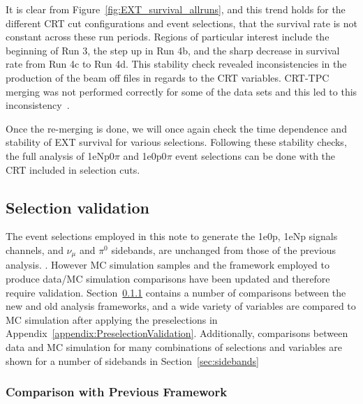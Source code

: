 It is clear from Figure~\ref{fig:EXT_survival_allruns}, and this trend holds for the different CRT cut configurations and event selections, that the survival rate is not constant across these run periods. Regions of particular interest include the beginning of Run 3, the step up in Run 4b, and the sharp decrease in survival rate from Run 4c to Run 4d. This stability check revealed inconsistencies in the production of the beam off files in regards to the CRT variables. CRT-TPC merging was not performed correctly for some of the data sets and this led to this inconsistency~\cite{Herbspresentation}.  %

Once the re-merging is done, we will once again check the time dependence and stability of EXT survival for various selections. Following these stability checks, the full analysis of 1eNp0$\pi$ and 1e0p0$\pi$ event selections can be done with the CRT included in selection cuts.

\subsection{Selection validation}
\label{sec:selvalid}

The event selections employed in this note to generate the 1e0p, 1eNp signals channels, and $\nu_{\mu}$ and $\pi^0$ sidebands, are unchanged from those of the previous analysis. . However MC simulation samples and the framework employed to produce data/MC simulation comparisons have been updated and therefore require validation. Section~\ref{sec:compprevframework} contains a number of comparisons between the new and old analysis frameworks, and a wide variety of variables are compared to MC simulation after applying the preselections in Appendix~\ref{appendix:PreselectionValidation}. Additionally, comparisons between data and MC simulation for many combinations of selections and variables are shown for a number of sidebands in Section~\ref{sec:sidebands}

\subsubsection{Comparison with Previous Framework}
\label{sec:compprevframework}

